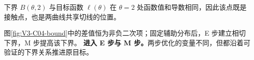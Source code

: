 \documentclass[UTF8,a4paper,11pt,openany]{ctexbook}
\begin{document}
\setcounter{page}{426}
\setcounter{chapter}{20}
\setcounter{figure}{0}
\pagestyle{headings}
\begin{geometrybox}
下界 $B(\theta,2)$ 与目标函数 $\ell(\theta)$ 在 $\theta=2$ 处函数值和导数相同，因此该点既是接触点，也是两曲线共享切线的位置。
\end{geometrybox}

图\ref{fig:V3-C04-bound}中的差值恒为非负二次项；固定辅助分布后，E 步建立相切下界，M 步提高该下界。
\textbf{进入 E 步与 M 步。}两步优化的变量不同，但都沿着可验证的下界关系推进原目标。
\end{document}
